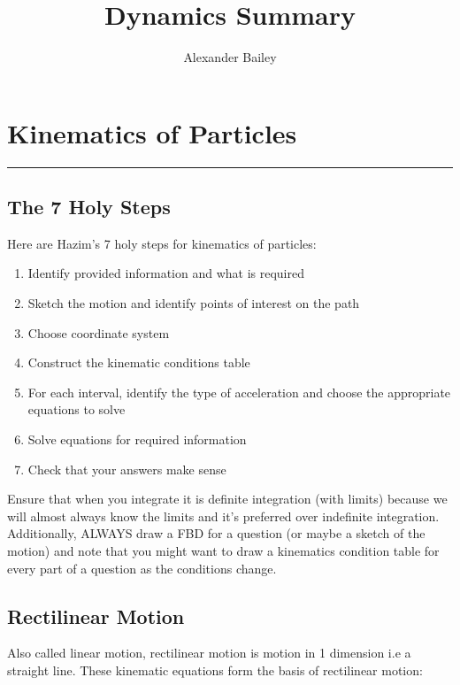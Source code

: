 \documentclass[a4paper, 12pt]{article}
\begin{document}
\title{Dynamics Summary}
\author{Alexander Bailey}

\maketitle

\section*{Kinematics of Particles}
\par\noindent\rule{0.4pt}{0.4pt}
\begin{center}
\subsection*{The 7 Holy Steps}
\end{center}
Here are Hazim's 7 holy steps for kinematics of particles:
\begin{enumerate}
    \item Identify provided information and what is required 
    \item Sketch the motion and identify points of interest on the path 
    \item Choose coordinate system
    \item Construct the kinematic conditions table 
    \item For each interval, identify the type of acceleration and choose the appropriate equations to solve
    \item Solve equations for required information
    \item Check that your answers make sense
\end{enumerate}
\noindent
Ensure that when you integrate it is definite integration (with limits) because we will almost 
always know the limits and it's preferred over indefinite integration. Additionally, ALWAYS draw a FBD for a question
(or maybe a sketch of the motion) and note that you might want to draw a kinematics condition table for every
part of a question as the conditions change.

\begin{center}
\subsection*{Rectilinear Motion}
\end{center}
Also called linear motion, rectilinear motion is motion in 1 dimension i.e a straight line.
These kinematic equations form the basis of rectilinear motion:
\end{document}
